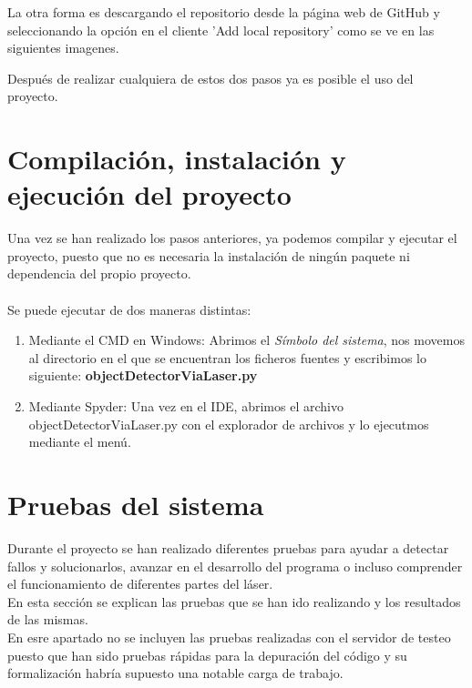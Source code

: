 La otra forma es descargando el repositorio desde la página web de GitHub y seleccionando la opción en el cliente 'Add local repository' como se ve en las siguientes imagenes.\\


Después de realizar cualquiera de estos dos pasos ya es posible el uso del proyecto.\\


\section{Compilación, instalación y ejecución del proyecto}
Una vez se han realizado los pasos anteriores, ya podemos compilar y ejecutar el proyecto, puesto que no es necesaria la instalación de ningún paquete ni dependencia del propio proyecto.\\
\\
Se puede ejecutar de dos maneras distintas:
\begin{enumerate}
	\item Mediante el CMD en Windows: Abrimos el \textit{Símbolo del sistema}, nos movemos al directorio en el que se encuentran los ficheros fuentes y escribimos lo siguiente: \textbf{objectDetectorViaLaser.py}
	
	\item Mediante Spyder: Una vez en el IDE, abrimos el archivo objectDetectorViaLaser.py con el explorador de archivos y lo ejecutmos mediante el menú.
\end{enumerate}



\section{Pruebas del sistema}
Durante el proyecto se han realizado diferentes pruebas para ayudar a detectar fallos y solucionarlos, avanzar en el desarrollo del programa o incluso comprender el funcionamiento de diferentes partes del láser.\\ En esta sección se explican las pruebas que se han ido realizando y los resultados de las mismas.
\\

En esre apartado no se incluyen las pruebas realizadas con el servidor de testeo puesto que han sido pruebas rápidas para la depuración del código y su formalización habría supuesto una notable carga de trabajo.

